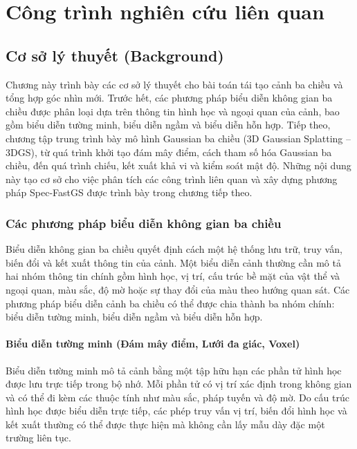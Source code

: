 \chapter{Công trình nghiên cứu liên quan}
\label{Chapter2}

\section{Cơ sở lý thuyết (Background)}
\label{sec:background}

Chương này trình bày các cơ sở lý thuyết cho bài toán tái tạo cảnh ba chiều và tổng hợp góc nhìn mới. Trước hết, các phương pháp biểu diễn không gian ba chiều được phân loại dựa trên thông tin hình học và ngoại quan của cảnh, bao gồm biểu diễn tường minh, biểu diễn ngầm và biểu diễn hỗn hợp. Tiếp theo, chương tập trung trình bày mô hình Gaussian ba chiều (3D Gaussian Splatting -- 3DGS), từ quá trình khởi tạo đám mây điểm, cách tham số hóa Gaussian ba chiều, đến quá trình chiếu, kết xuất khả vi và kiểm soát mật độ. Những nội dung này tạo cơ sở cho việc phân tích các công trình liên quan và xây dựng phương pháp Spec-FastGS được trình bày trong chương tiếp theo.

\subsection{Các phương pháp biểu diễn không gian ba chiều}
\label{subsec:3d-scene-representations}

Biểu diễn không gian ba chiều quyết định cách một hệ thống lưu trữ, truy vấn, biến đổi và kết xuất thông tin của cảnh. Một biểu diễn cảnh thường cần mô tả hai nhóm thông tin chính gồm hình học, vị trí, cấu trúc bề mặt của vật thể và ngoại quan, màu sắc, độ mờ hoặc sự thay đổi của màu theo hướng quan sát. Các phương pháp biểu diễn cảnh ba chiều có thể được chia thành ba nhóm chính: biểu diễn tường minh, biểu diễn ngầm và biểu diễn hỗn hợp.

\subsubsection{Biểu diễn tường minh (Đám mây điểm, Lưới đa giác, Voxel)}
\label{subsubsec:explicit-representations}

Biểu diễn tường minh mô tả cảnh bằng một tập hữu hạn các phần tử hình học được lưu trực tiếp trong bộ nhớ. Mỗi phần tử có vị trí xác định trong không gian và có thể đi kèm các thuộc tính như màu sắc, pháp tuyến và độ mờ. Do cấu trúc hình học được biểu diễn trực tiếp, các phép truy vấn vị trí, biến đổi hình học và kết xuất thường có thể được thực hiện mà không cần lấy mẫu dày đặc một trường liên tục.

